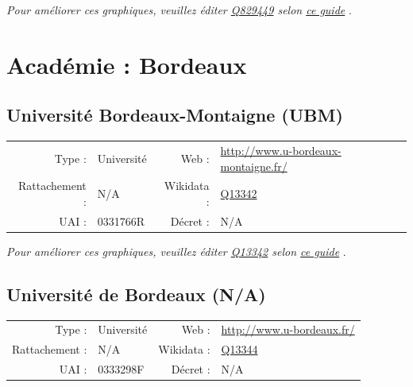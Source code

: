 \documentclass[11pt,french,landscape]{article}
\begin{document}
\textit{\scriptsize Pour améliorer ces graphiques, veuillez éditer \href{https://www.wikidata.org/entity/Q829449}{Q829449}  selon \href{https://github.com/cpesr/wikidataESR/blob/master/Rmd/wikidataESR.md}{ce guide}}
.


\newpage

\hypertarget{acaduxe9mie-bordeaux}{%
\section{Académie : Bordeaux}\label{acaduxe9mie-bordeaux}}

\hypertarget{universituxe9-bordeaux-montaigne-ubm}{%
\subsection{Université Bordeaux-Montaigne
(UBM)}\label{universituxe9-bordeaux-montaigne-ubm}}

\begin{tabular*}{0.45\textwidth}{rp{2cm}rl}  
\hline  
Type : & Université & Web : &\href{http://www.u-bordeaux-montaigne.fr/}{http://www.u-bordeaux-montaigne.fr/} \\  
Rattachement : & N/A & Wikidata : & \href{https://www.wikidata.org/entity/Q13342}{Q13342} \\  
UAI : & 0331766R & Décret : & N/A \\  
\hline  
\end{tabular*}

\textit{\scriptsize Pour améliorer ces graphiques, veuillez éditer \href{https://www.wikidata.org/entity/Q13342}{Q13342}  selon \href{https://github.com/cpesr/wikidataESR/blob/master/Rmd/wikidataESR.md}{ce guide}}
.


\newpage

\hypertarget{universituxe9-de-bordeaux-na}{%
\subsection{Université de Bordeaux
(N/A)}\label{universituxe9-de-bordeaux-na}}

\begin{tabular*}{0.45\textwidth}{rp{2cm}rl}  
\hline  
Type : & Université & Web : &\href{http://www.u-bordeaux.fr/}{http://www.u-bordeaux.fr/} \\  
Rattachement : & N/A & Wikidata : & \href{https://www.wikidata.org/entity/Q13344}{Q13344} \\  
UAI : & 0333298F & Décret : & N/A \\  
\hline  
\end{tabular*}
\end{document}
